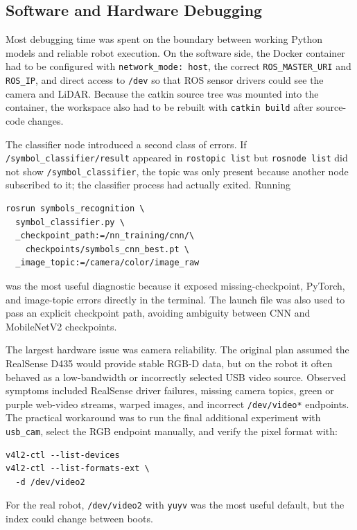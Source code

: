 \documentclass[letterpaper, 10 pt, conference]{ieeeconf/ieeeconf}
\begin{document}
\subsection{Software and Hardware Debugging}

Most debugging time was spent on the boundary between working Python models
and reliable robot execution.
On the software side, the Docker container had to be configured with
\texttt{network\_mode: host}, the correct \texttt{ROS\_MASTER\_URI} and
\texttt{ROS\_IP}, and direct access to \texttt{/dev} so that ROS sensor
drivers could see the camera and LiDAR.
Because the catkin source tree was mounted into the container, the workspace
also had to be rebuilt with \texttt{catkin build} after source-code changes.

The classifier node introduced a second class of errors.
If \texttt{/symbol\_classifier/result} appeared in \texttt{rostopic list} but
\texttt{rosnode list} did not show \texttt{/symbol\_classifier}, the topic was
only present because another node subscribed to it; the classifier process had
actually exited.
Running
\begin{verbatim}
rosrun symbols_recognition \
  symbol_classifier.py \
  _checkpoint_path:=/nn_training/cnn/\
    checkpoints/symbols_cnn_best.pt \
  _image_topic:=/camera/color/image_raw
\end{verbatim}
was the most useful diagnostic because it exposed missing-checkpoint, PyTorch,
and image-topic errors directly in the terminal.
The launch file was also used to pass an explicit checkpoint path, avoiding
ambiguity between CNN and MobileNetV2 checkpoints.

The largest hardware issue was camera reliability.
The original plan assumed the RealSense D435 would provide stable RGB-D data,
but on the robot it often behaved as a low-bandwidth or incorrectly selected
USB video source.
Observed symptoms included RealSense driver failures, missing camera topics,
green or purple web-video streams, warped images, and incorrect
\texttt{/dev/video*} endpoints.
The practical workaround was to run the final additional experiment with
\texttt{usb\_cam}, select the RGB endpoint manually, and verify the pixel
format with:
\begin{verbatim}
v4l2-ctl --list-devices
v4l2-ctl --list-formats-ext \
  -d /dev/video2
\end{verbatim}
For the real robot, \texttt{/dev/video2} with \texttt{yuyv} was the most useful
default, but the index could change between boots.
\end{document}
